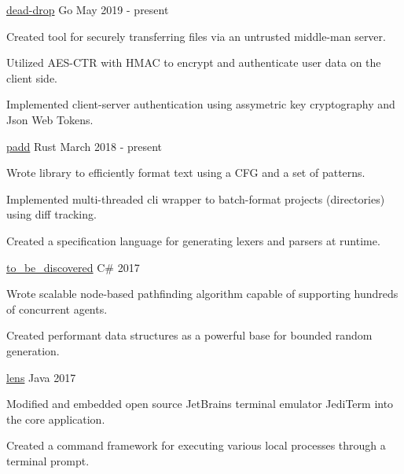 
\begin{cventries}
  
   {\href{https://github.com/srhickma/dead-drop}{dead-drop}} {Go} {May 2019
    - present} {
    \begin{cvitems}
    \item Created tool for securely transferring files via an untrusted
      middle-man server.
    \item Utilized AES-CTR with HMAC to encrypt and authenticate user data on
      the client side.
    \item Implemented client-server authentication using assymetric key
      cryptography and Json Web Tokens.
    \end{cvitems}
  }
  
   {\href{https://github.com/srhickma/padd}{padd}}
  {Rust} {March 2018 - present} {
    \begin{cvitems}
    \item Wrote library to efficiently format text using a CFG and a set of
      patterns.
    \item Implemented multi-threaded cli wrapper to batch-format projects
      (directories) using diff tracking.
    \item Created a specification language for generating lexers and parsers at
      runtime.
    \end{cvitems}
  }
  
  {\href{https://github.com/srhickma/to\_be\_discovered}{to\_be\_discovered}} {C\#} {2017} {
    \begin{cvitems}
    \item Wrote scalable node-based pathfinding algorithm capable of supporting
      hundreds of concurrent agents.
    \item Created performant data structures as a powerful base for bounded
      random generation.
    \end{cvitems}
  }
  
   {\href{https://github.com/srhickma/lens}{lens}} {Java}
  {2017} {
    \begin{cvitems}
    \item Modified and embedded open source JetBrains terminal emulator JediTerm
      into the core application.
    \item Created a command framework for executing various local processes
      through a terminal prompt.
    \end{cvitems}
  }
  

\end{cventries}
